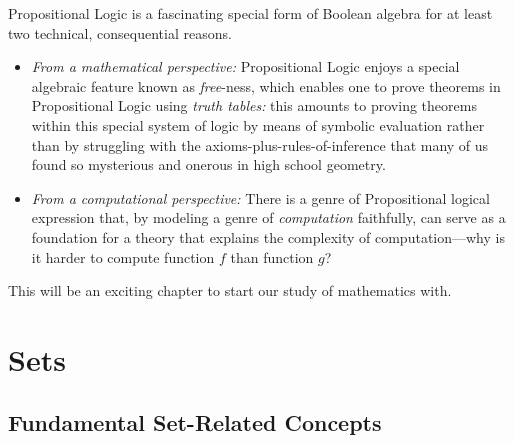 \begin{itemize}
\smallskip

Propositional Logic is a fascinating special form of Boolean algebra for at least two technical, consequential reasons.
  \begin{itemize}
  \item
{\em From a mathematical perspective:}
Propositional Logic enjoys a special algebraic feature known as {\it free}-ness, which enables one to prove theorems in Propositional Logic using {\em truth tables:} this amounts to proving theorems within this special system of logic by means of symbolic evaluation rather than by struggling with the axioms-plus-rules-of-inference that many of us found so mysterious and onerous in high school geometry.
  \item
{\em From a computational perspective:}
There is a genre of Propositional logical expression that, by modeling a genre of {\em computation} faithfully, can serve as a foundation for a theory that explains the complexity of computation---why is it harder to compute function $f$ than function $g$?
  \end{itemize}
\end{itemize}

\medskip

This will be an exciting chapter to start our study of mathematics with.

\section{Sets}
\label{sec:sets}

\subsection{Fundamental Set-Related Concepts}
\label{sec:set-concepts}

